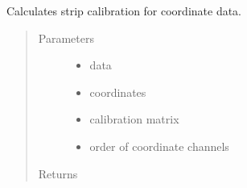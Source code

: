 \documentclass[letterpaper,10pt,english]{sphinxmanual}
\begin{document}

\begin{fulllineitems}
\label{\detokenize{autodocs/data:listmode.data.strip_cal}}
\sphinxAtStartPar
Calculates strip calibration for coordinate data.
\begin{quote}\begin{description}
\item[{Parameters}] \leavevmode\begin{itemize}
\item {} 
\sphinxAtStartPar
{} \textendash{} data

\item {} 
\sphinxAtStartPar
{} \textendash{} coordinates

\item {} 
\sphinxAtStartPar
{} \textendash{} calibration matrix

\item {} 
\sphinxAtStartPar
{} \textendash{} order of coordinate channels

\end{itemize}

\item[{Returns}] \leavevmode
\sphinxAtStartPar


\end{description}\end{quote}

\end{fulllineitems}

\end{document}
